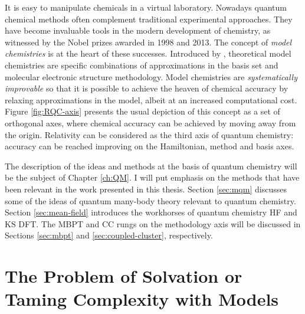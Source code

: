 It is easy to manipulate chemicals in a virtual laboratory. Nowadays
quantum chemical methods often complement traditional experimental
approaches. They have become invaluable tools in the modern development
of chemistry,\autocite{Lee1995-pw, Helgaker2004-oz, Tajti2004-ye} as
witnessed by the Nobel prizes awarded in 1998\autocite{Nobel1998} and
2013.\autocite{Nobel2013}
The concept of \emph{model chemistries} is at the heart of these
successes. Introduced by \citeauthor{Pople1999-gt}, theoretical model
chemistries are specific combinations of approximations in the basis set
and molecular electronic structure methodology.\autocite{Pople1999-gt}
Model chemistries are \emph{systematically improvable} so that it is
possible to achieve the heaven of chemical accuracy by relaxing
approximations in the model, albeit at an increased computational cost.
Figure \ref{fig:RQC-axis} presents the usual depiction of this concept
as a set of orthogonal axes, where chemical accuracy can be achieved by
moving away from the origin.
Relativity can be considered as the third axis of quantum
chemistry: accuracy can be reached improving on the Hamiltonian, method
and basis axes.\autocite{Saue2011-qg}

The description of the ideas and methods at the basis of quantum
chemistry will be the subject of Chapter \ref{ch:QM}.
I will put emphasis on the methods that have been relevant in the work
presented in this thesis. Section \ref{sec:mqm} discusses some of the
ideas of quantum many-body theory relevant to quantum chemistry. Section
\ref{sec:mean-field} introduces the workhorses of quantum chemistry
\acrlong*{HF} and \acrlong*{KS} \acrlong*{DFT}.
The \acrlong*{MBPT} and \acrlong*{CC} rungs on the methodology axis will
be discussed in Sections \ref{sec:mbpt} and \ref{sec:coupled-cluster},
respectively.

\section*{The Problem of Solvation or Taming Complexity with Models}

